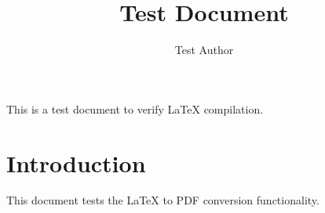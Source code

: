 \documentclass{article}
\begin{document}
\title{Test Document}
\author{Test Author}
\maketitle
This is a test document to verify LaTeX compilation.
\section{Introduction}
This document tests the LaTeX to PDF conversion functionality.
\end{document}
